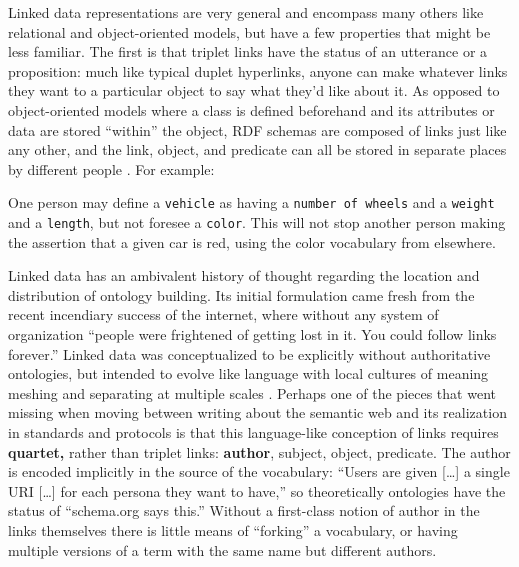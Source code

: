 Linked data representations are very general and encompass many others
like relational \citep{berners-leeRelationalDatabasesSemantic2009}  and object-oriented models, but have a few properties that might be
less familiar. The first is that triplet links have the status of an
utterance or a proposition: much like typical duplet hyperlinks, anyone
can make whatever links they want to a particular object to say what
they'd like about it. As opposed to object-oriented models where a class
is defined beforehand and its attributes or data are stored ``within''
the object, RDF schemas are composed of links just like any other, and
the link, object, and predicate can all be stored in separate places by
different people \citep{berners-leeWhatSemanticWeb1998} . For
example:

\begin{leftbar}
One person may define a \texttt{vehicle} as having a
\texttt{number\ of\ wheels} and a \texttt{weight} and a \texttt{length},
but not foresee a \texttt{color}. This will not stop another person
making the assertion that a given car is red, using the color vocabulary
from elsewhere. \citep{berners-leeWhatSemanticWeb1998} 
\end{leftbar}

Linked data has an ambivalent history of thought regarding the location
and distribution of ontology building. Its initial formulation came
fresh from the recent incendiary success of the internet, where without
any system of organization ``people were frightened of getting lost in
it. You could follow links forever.'' \citep{berners-leeWhatSemanticWeb1998}  Linked data was conceptualized to be
explicitly without authoritative ontologies, but intended to evolve like
language with local cultures of meaning meshing and separating at
multiple scales \citep{berners-leeSemanticWeb2001} . Perhaps one
of the pieces that went missing when moving between writing about the
semantic web and its realization in standards and protocols is that this
language-like conception of links requires \textbf{quartet,} rather than
triplet links: \textbf{author}, subject, object, predicate. The author
is encoded implicitly in the source of the vocabulary: ``Users are given
{[}\ldots{]} a single URI {[}\ldots{]} for each persona they want to
have,'' \citep{berners-leeSociallyAwareCloud2009}  so
theoretically ontologies have the status of ``schema.org says this.''
Without a first-class notion of author in the links themselves there is
little means of ``forking'' a vocabulary, or having multiple versions of
a term with the same name but different authors.

